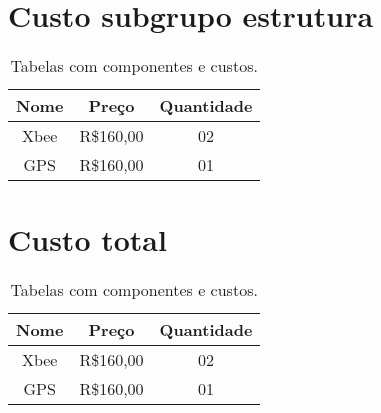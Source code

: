 \section{Custo subgrupo estrutura}
\begin{table}[h]
	\centering
	\label{Custosubgrupoestrutura}	
	\begin{tabular}{ccc}
		\toprule
		\textbf{Nome} & \textbf{Preço} & \textbf{Quantidade} \\
		\midrule
		Xbee & R\$160,00 & 02          \\
		GPS & R\$160,00 & 01             \\
		\bottomrule
	\end{tabular}	
	\caption{Tabelas com componentes e custos.}
\end{table}
\section{Custo total}

\begin{table}[h]
	\centering
	\label{Custototal}	
	\begin{tabular}{ccc}
		\toprule
		\textbf{Nome} & \textbf{Preço} & \textbf{Quantidade} \\
		\midrule
		Xbee & R\$160,00 & 02          \\
		GPS & R\$160,00 & 01             \\
		\bottomrule
	\end{tabular}	
	\caption{Tabelas com componentes e custos.}
\end{table}